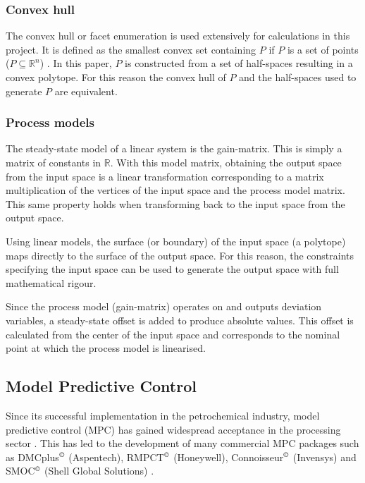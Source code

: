 \documentclass[final,authoryear,5pt,times,twocolumn]{elsarticle}
\begin{document}
\subsubsection{Convex hull}
The convex hull or facet enumeration is used extensively for calculations in this project.
It is defined as the smallest convex set containing $P$ if $P$ is a set of points ($P \subseteq \mathbb{R}^n$) \citep[74]{wenger}.
In this paper, $P$ is constructed from a set of half-spaces resulting in a convex polytope.
For this reason the convex hull of $P$ and the half-spaces used to generate $P$ are equivalent.

\subsubsection{Process models}
The steady-state model of a linear system is the gain-matrix.
This is simply a matrix of constants in $\mathbb{R}$.
With this model matrix, obtaining the output space from the input space is a linear transformation \citep[48-49,~166]{leung} corresponding to a matrix multiplication of the vertices of the input space and the process model matrix.
This same property holds when transforming back to the input space from the output space.

Using linear models, the surface (or boundary) of the input space (a polytope) maps directly to the surface of the output space.
For this reason, the constraints specifying the input space can be used to generate the output space with full mathematical rigour.

Since the process model (gain-matrix) operates on and outputs deviation variables, a steady-state offset is added to produce absolute values.
This offset is calculated from the center of the input space and corresponds to the nominal point at which the process model is linearised.

\subsection{Model Predictive Control}
Since its successful implementation in the petrochemical industry, model predictive control (MPC) has gained widespread acceptance in the processing sector \citep[1]{maciejowskimpc}. 
This has led to the development of many commercial MPC packages such as DMCplus$^{\copyright}$ (Aspentech), RMPCT$^{\copyright}$ (Honeywell), Connoisseur$^{\copyright}$ (Invensys) and SMOC$^{\copyright}$ (Shell Global Solutions) \citep{qinbadgwell}.
\end{document}
